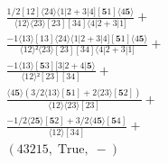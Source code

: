 \documentclass[varwidth, border=5pt]{standalone}
\begin{document}
\begin{my}
$\begin{gathered}
\scriptscriptstyle\frac{1/2[12]⟨24⟩⟨1|2+3|4][𝟓1]⟨4𝟓⟩}{⟨12⟩⟨23⟩[23][34]⟨4|2+3|1]} +\\
\scriptscriptstyle\frac{-1⟨13⟩[13]⟨24⟩⟨1|2+3|4][𝟓1]⟨4𝟓⟩}{⟨12⟩²⟨23⟩[23][34]⟨4|2+3|1]} +\\
\scriptscriptstyle\frac{-1⟨13⟩[𝟓3][3|2+4|𝟓⟩}{⟨12⟩²[23][34]} +\\
\scriptscriptstyle\frac{⟨4𝟓⟩(3/2⟨13⟩[𝟓1]+2⟨23⟩[𝟓2])}{⟨12⟩⟨23⟩[23]} +\\
\scriptscriptstyle\frac{-1/2⟨2𝟓⟩[𝟓2]+3/2⟨4𝟓⟩[𝟓4]}{⟨12⟩[34]} +\\
\scriptscriptstyle(43215,\;\text{True},\;-) \phantom{+}
\end{gathered}$
\end{my}
\end{document}
